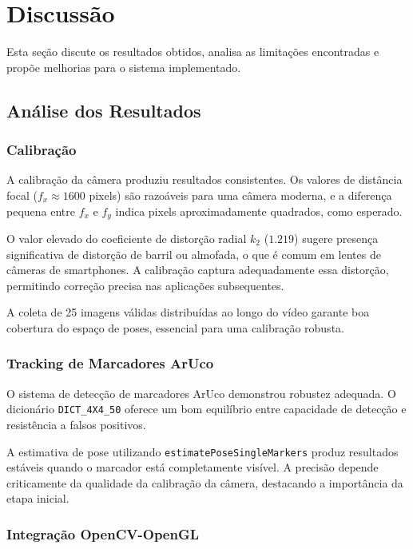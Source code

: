 \section{Discussão}
\label{sec:discussao}

Esta seção discute os resultados obtidos, analisa as limitações encontradas e propõe melhorias para o sistema implementado.

\subsection{Análise dos Resultados}

\subsubsection{Calibração}

A calibração da câmera produziu resultados consistentes. Os valores de distância focal ($f_x \approx 1600$ pixels) são razoáveis para uma câmera moderna, e a diferença pequena entre $f_x$ e $f_y$ indica pixels aproximadamente quadrados, como esperado.

O valor elevado do coeficiente de distorção radial $k_2$ ($1.219$) sugere presença significativa de distorção de barril ou almofada, o que é comum em lentes de câmeras de smartphones. A calibração captura adequadamente essa distorção, permitindo correção precisa nas aplicações subsequentes.

A coleta de 25 imagens válidas distribuídas ao longo do vídeo garante boa cobertura do espaço de poses, essencial para uma calibração robusta.

\subsubsection{Tracking de Marcadores ArUco}

O sistema de detecção de marcadores ArUco demonstrou robustez adequada. O dicionário \texttt{DICT\_4X4\_50} oferece um bom equilíbrio entre capacidade de detecção e resistência a falsos positivos.

A estimativa de pose utilizando \texttt{estimatePoseSingleMarkers} produz resultados estáveis quando o marcador está completamente visível. A precisão depende criticamente da qualidade da calibração da câmera, destacando a importância da etapa inicial.

\subsubsection{Integração OpenCV-OpenGL}

